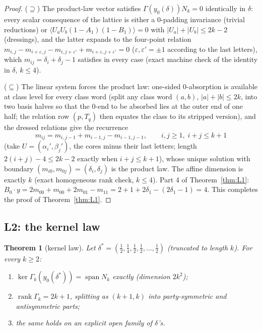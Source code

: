 \documentclass[11pt]{article}
\newtheorem{theorem}{Theorem}[section]
\newcommand{\la}{\langle}
\newcommand{\ra}{\rangle}
\newcommand{\eps}{\varepsilon}
\DeclareMathOperator{\rk}{rank}
\DeclareMathOperator{\Span}{span}
\begin{document}
\begin{proof}
($\supseteq$) The product-law vector satisfies $\Gamma(y_0(\delta))N_k=0$
identically in $\delta$: every scalar consequence of the lattice is either
a $0$-padding invariance (trivial reductions) or
$\la U_aU_b(1-A_1)(1-B_1)\ra=0$ with $|U_a|+|U_b|\le2k-2$ (dressings), and
the latter expands to the four-point relation
$m_{i,j}-m_{i+\eps,j}-m_{i,j+\eps'}+m_{i+\eps,j+\eps'}=0$
($\eps,\eps'=\pm1$ according to the last letters), which
$m_{ij}=\delta_i+\delta_j-1$ satisfies in every case (exact machine check
of the identity in $\delta$, $k\le4$).

($\subseteq$) The linear system forces the product law: one-sided
$0$-absorption is available at class level for every class word (split any
class word $(a,b)$, $|a|+|b|\le2k$, into two basis halves so that the
$0$-end to be absorbed lies at the outer end of one half; the relation row
$(p,T_q)$ then equates the class to its stripped version), and the dressed
relations give the recurrence
\[
m_{ij}=m_{i,j-1}+m_{i-1,j}-m_{i-1,j-1},\qquad i,j\ge1,\;i+j\le k+1
\]
(take $U=(\alpha_i',\beta_j')$, the cores minus their last letters; length
$2(i{+}j)-4\le2k-2$ exactly when $i+j\le k+1$), whose unique solution with
boundary $(m_{i0},m_{0j})=(\delta_i,\delta_j)$ is the product law. The
affine dimension is exactly $k$ (exact homogeneous rank check, $k\le4$).
Part 4 of Theorem~\ref{thm:L1}:
$B_0\cdot y=2m_{00}+m_{00}+2m_{01}-m_{11}
=2+1+2\delta_1-(2\delta_1-1)=4$. This completes the proof of
Theorem~\ref{thm:L1}.
\end{proof}

\subsection{L2: the kernel law}

\begin{theorem}[kernel law]\label{thm:L2}
Let $\delta^\ast=(\tfrac12,\tfrac14,\tfrac12,\tfrac12,\dots,\tfrac12)$
(truncated to length $k$). For every $k\ge2$:
\begin{enumerate}
\item $\ker\Gamma_k(y_0(\delta^\ast))=\Span N_k$ exactly (dimension
  $2k^2$);
\item $\rk\Gamma_k=2k+1$, splitting as $(k{+}1,k)$ into party-symmetric
  and antisymmetric parts;
\item the same holds on an explicit open family of $\delta$'s.
\end{enumerate}
\end{theorem}
\end{document}
